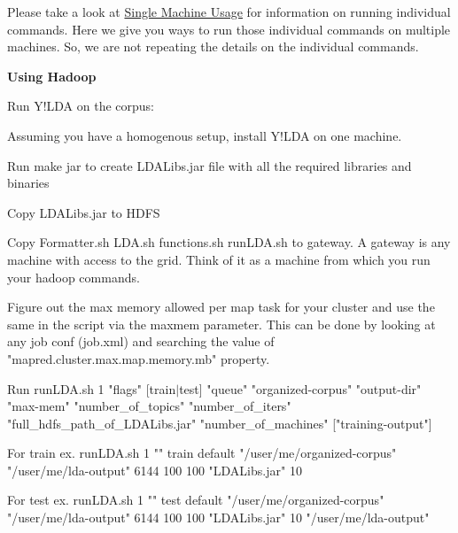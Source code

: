 Please take a look at \hyperlink{single__machine__usage}{Single Machine Usage} for information on running individual commands. Here we give you ways to run those individual commands on multiple machines. So, we are not repeating the details on the individual commands. 
\begin{DoxyEnumerate}
\item 

{\bfseries Using Hadoop} 
\begin{DoxyEnumerate}
\item 

Run Y!LDA on the corpus: 
\begin{DoxyEnumerate}
\item 

Assuming you have a homogenous setup, install Y!LDA on one machine. 
\item 

Run make jar to create LDALibs.jar file with all the required libraries and binaries 
\item 

Copy LDALibs.jar to HDFS 
\item 

Copy Formatter.sh LDA.sh functions.sh runLDA.sh to gateway. A gateway is any machine with access to the grid. Think of it as a machine from which you run your hadoop commands. 
\item 

Figure out the max memory allowed per map task for your cluster and use the same in the script via the maxmem parameter. This can be done by looking at any job conf (job.xml) and searching the value of "mapred.cluster.max.map.memory.mb" property. 
\item 

Run {\ttfamily runLDA.sh 1 "flags" \mbox{[}train$|$test\mbox{]} "queue" "organized-\/corpus" "output-\/dir" "max-\/mem" "number\_\-of\_\-topics" "number\_\-of\_\-iters" "full\_\-hdfs\_\-path\_\-of\_\-LDALibs.jar" "number\_\-of\_\-machines" \mbox{[}"training-\/output"\mbox{]} }\par
\par
 For train ex. {\ttfamily runLDA.sh 1 "" train default "/user/me/organized-\/corpus" "/user/me/lda-\/output" 6144 100 100 "LDALibs.jar" 10 }\par
\par
 For test ex. {\ttfamily runLDA.sh 1 "" test default "/user/me/organized-\/corpus" "/user/me/lda-\/output" 6144 100 100 "LDALibs.jar" 10 "/user/me/lda-\/output" }  
\item 


\end{DoxyEnumerate}
\end{DoxyEnumerate}
\end{DoxyEnumerate}
